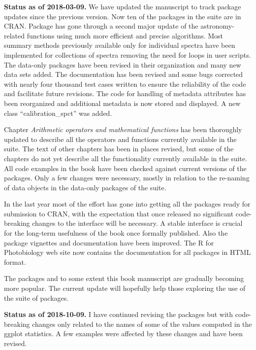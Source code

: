 \begin{shaded}
\noindent
\textbf{Status as of 2018-03-09.} We have updated the manuscript to track package updates since the previous version. Now ten of the packages in the suite are in CRAN. Package  has gone through a second major update of the astronomy-related functions using much more efficient and precise algorithms. Most summary methods previously available only for individual spectra have been implemented for collections of spectra removing the need for loops in user scripts. The data-only packages have been revised in their organization and many new data sets added. The documentation has been revised and some bugs corrected with nearly four thousand test cases written to ensure the reliability of the code and facilitate future revisions. The code for handling of metadata attributes has been reorganized and additional metadata is now stored and displayed. A new class ``calibration\_spct'' was added.

Chapter \emph{Arithmetic operators and mathematical functions} has been thoroughly updated to describe all the operators and functions currently available in the suite. The text of other chapters has been in places revised, but some of the chapters do not yet describe all the functionality currently available in the suite. All code examples in the book have been checked against current versions of the packages. Only a few changes were necessary, mostly in relation to the re-naming of data objects in the data-only packages of the suite.

In the last year most of the effort has gone into getting all the packages ready for submission to CRAN, with the expectation that once released no significant code-breaking changes to the interface will be necessary. A stable interface is crucial for the long-term usefulness of the book once formally published. Also the package vignettes and documentation have been improved. The R for Photobiology web site now contains the documentation for all packages in HTML format.

The packages and to some extent this book manuscript are gradually becoming more popular. The current update will hopefully help those exploring the use of the suite of packages.
\end{shaded}

\begin{shaded}
\noindent
\textbf{Status as of 2018-10-09.} I have continued revising the packages but with code-breaking changes only related to the names of some of the values computed in the ggplot statistics. A few examples were affected by these changes and have been revised.
\end{shaded}

